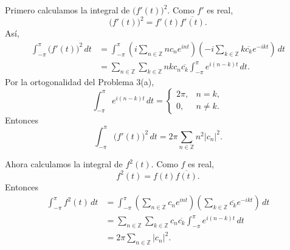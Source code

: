 \documentclass[11pt,letterpaper]{article}
\newcommand{\Z}{\mathbb{Z}}
\begin{document}
Primero calculamos la integral de $\bigl(f'(t)\bigr)^2$. Como $f'$ es real,
\begin{equation*}
    \bigl(f'(t)\bigr)^2=f'(t)\overline{f'(t)}.
\end{equation*}
Así,
\begin{align*}
    \int_{-\pi}^{\pi}\bigl(f'(t)\bigr)^2\,dt
    &=\int_{-\pi}^{\pi}
    \left(i\sum_{n\in\Z}n c_ne^{int}\right)
    \left(-i\sum_{k\in\Z}k\overline{c_k}e^{-ikt}\right)\,dt \\
    &=\sum_{n\in\Z}\sum_{k\in\Z}nk c_n\overline{c_k}
    \int_{-\pi}^{\pi}e^{i(n-k)t}\,dt.
\end{align*}
Por la ortogonalidad del Problema 3(a),
\begin{equation*}
    \int_{-\pi}^{\pi}e^{i(n-k)t}\,dt=
    \begin{cases}
        2\pi, & n=k,\\
        0, & n\neq k.
    \end{cases}
\end{equation*}
Entonces
\begin{equation*}
    \int_{-\pi}^{\pi}\bigl(f'(t)\bigr)^2\,dt
    =2\pi\sum_{n\in\Z}n^2|c_n|^2.
\end{equation*}

Ahora calculamos la integral de $f^2(t)$. Como $f$ es real,
\begin{equation*}
    f^2(t)=f(t)\overline{f(t)}.
\end{equation*}
Entonces
\begin{align*}
    \int_{-\pi}^{\pi}f^2(t)\,dt
    &=\int_{-\pi}^{\pi}
    \left(\sum_{n\in\Z}c_ne^{int}\right)
    \left(\sum_{k\in\Z}\overline{c_k}e^{-ikt}\right)\,dt \\
    &=\sum_{n\in\Z}\sum_{k\in\Z}c_n\overline{c_k}
    \int_{-\pi}^{\pi}e^{i(n-k)t}\,dt \\
    &=2\pi\sum_{n\in\Z}|c_n|^2.
\end{align*}
\end{document}
